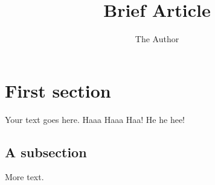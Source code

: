 \documentclass[11pt]{article} %
\title{Brief Article}
\author{The Author}
\begin{document}
\maketitle

\section{First section}

Your text goes here. Haaa Haaa Haa! He he hee!


\subsection{A subsection}

More text.
\end{document}
